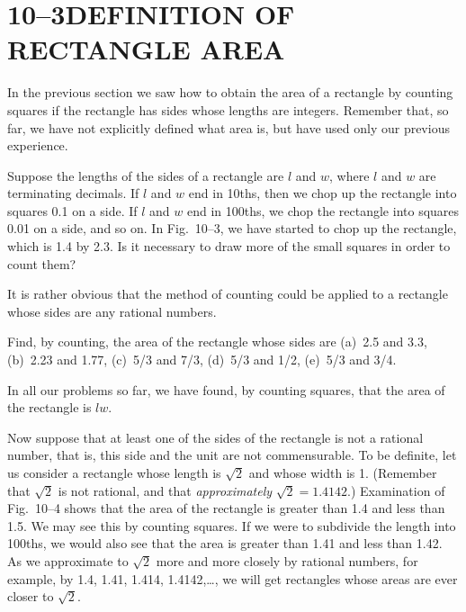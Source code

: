 \documentclass[11pt]{book}
\theoremstyle{bkplain}
\theoremstyle{XIplainnote}
\theoremstyle{bkplain}
\theoremstyle{bkplain}
\begin{document}
\section*{10--3\quad DEFINITION OF RECTANGLE AREA}

In the previous section we saw how to obtain the area of a rectangle by
counting squares if the rectangle has sides whose lengths are integers.
Remember that, so far, we have not explicitly defined what area is, but have
used only our previous experience.

\FIGXTHREE

Suppose the lengths of the sides of a rectangle are $l$ and $w$, where $l$ and
$w$ are terminating decimals. If $l$ and $w$ end in 10ths, then we chop up the
rectangle into squares 0.1 on a side. If $l$ and $w$ end in 100ths, we chop the
rectangle into squares 0.01 on a side, and so on. In Fig.~10--3, we have
started to chop up the rectangle, which is 1.4 by 2.3. Is it necessary to draw
more of the small squares in order to count them?

It is rather obvious that the method of counting could be applied to a
rectangle whose sides are any rational numbers.

\noindent Find, by counting, the area of the rectangle whose sides are
(a)~2.5 and 3.3, (b)~2.23 and 1.77, (c)~5/3 and 7/3, (d)~5/3 and 1/2,
(e)~5/3 and 3/4.

\medskip
In all our problems so far, we have found, by counting squares, that the area
of the rectangle is $lw$.

Now suppose that at least one of the sides of the rectangle is not a rational
number, that is, this side and the unit are not commensurable. To be definite,
let us consider a rectangle whose length is $\sqrt{2}$ and whose width is 1.
(Remember that $\sqrt{2}$ is not rational, and that \emph{approximately}
$\sqrt{2} = 1.4142$.) Examination of Fig.~10--4 shows that the area of the
rectangle is greater than 1.4 and less than 1.5. We may see this by counting
squares. If we were to subdivide the length into 100ths, we would also see
that the area is greater than 1.41 and less than 1.42. As we approximate to
$\sqrt{2}$ more and more closely by rational numbers, for example, by 1.4,
1.41, 1.414, 1.4142,\dots, we will get rectangles whose areas are ever closer
to $\sqrt{2}$.

\FIGXFOUR
\end{document}
